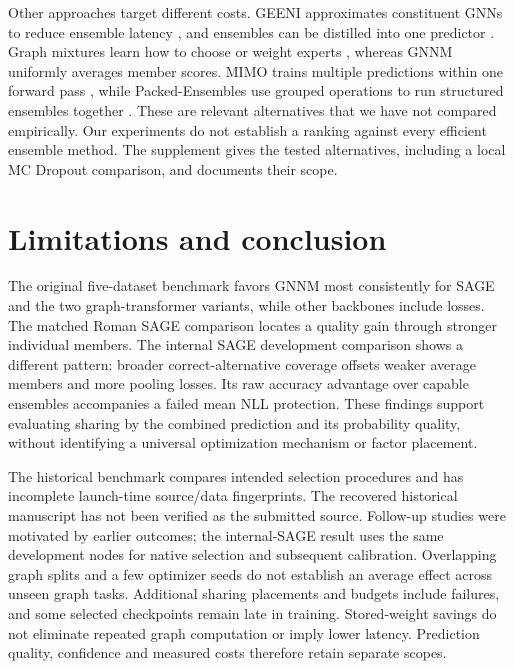 \documentclass{article}
\begin{document}
Other approaches target different costs. GEENI approximates constituent GNNs to reduce ensemble latency \citep{nagarajan2022geeni}, and ensembles can be distilled into one predictor \citep{zhang2024e2gnn}. Graph mixtures learn how to choose or weight experts \citep{wang2023graph,deng2025mixture}, whereas GNNM uniformly averages member scores. MIMO trains multiple predictions within one forward pass \citep{havasi2021training}, while Packed-Ensembles use grouped operations to run structured ensembles together \citep{laurent2023packed}. These are relevant alternatives that we have not compared empirically. Our experiments do not establish a ranking against every efficient ensemble method. The supplement gives the tested alternatives, including a local MC Dropout comparison, and documents their scope.

\section{Limitations and conclusion}
The original five-dataset benchmark favors GNNM most consistently for SAGE and the two graph-transformer variants, while other backbones include losses. The matched Roman SAGE comparison locates a quality gain through stronger individual members. The internal SAGE development comparison shows a different pattern: broader correct-alternative coverage offsets weaker average members and more pooling losses. Its raw accuracy advantage over capable ensembles accompanies a failed mean NLL protection. These findings support evaluating sharing by the combined prediction and its probability quality, without identifying a universal optimization mechanism or factor placement.

The historical benchmark compares intended selection procedures and has incomplete launch-time source/data fingerprints. The recovered historical manuscript has not been verified as the submitted source. Follow-up studies were motivated by earlier outcomes; the internal-SAGE result uses the same development nodes for native selection and subsequent calibration. Overlapping graph splits and a few optimizer seeds do not establish an average effect across unseen graph tasks. Additional sharing placements and budgets include failures, and some selected checkpoints remain late in training. Stored-weight savings do not eliminate repeated graph computation or imply lower latency. Prediction quality, confidence and measured costs therefore retain separate scopes.
\end{document}
